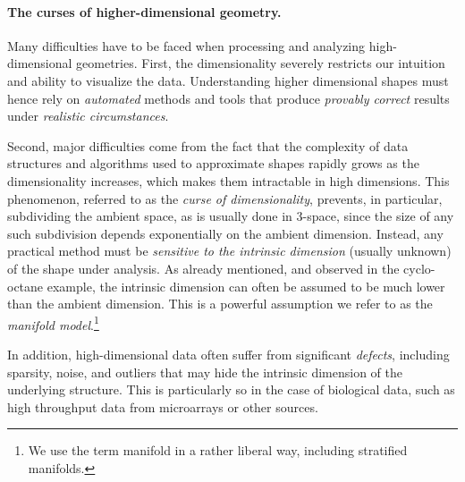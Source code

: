 \vspace{-3.1mm}

\paragraph{The curses of higher-dimensional geometry.} 
Many difficulties have to be faced when processing and analyzing
high-dimensional geometries. First, the dimensionality severely restricts our intuition and ability to visualize the data.  Understanding higher dimensional shapes must hence rely on {\em automated} methods and tools that produce {\em provably correct} results under {\em realistic circumstances}.

Second, major difficulties come from the fact that the complexity of
data structures and algorithms used to approximate shapes rapidly
grows as the dimensionality increases, which makes them intractable in
high dimensions.  This phenomenon, referred to as the {\em curse of
  dimensionality}, prevents,  in particular, subdividing  the ambient space, as is usually done in 3-space, since the size of any such subdivision depends exponentially on the ambient dimension. Instead, any practical method must be {\em sensitive to the intrinsic dimension} (usually unknown) of the shape under analysis. As already mentioned, and observed in the cyclo-octane example, the intrinsic dimension can often be assumed to be much lower than the ambient dimension. This is a powerful assumption we refer to as the {\em manifold model}.\footnote{We use the term manifold in a rather liberal way, including stratified manifolds.} %


In addition, high-dimensional data often suffer from significant {\em defects}, including sparsity, noise, and outliers that may hide the intrinsic dimension of the underlying structure. This is particularly so in the case of biological data, such as high throughput data from microarrays or other sources. %
\vspace{-3.1mm}

